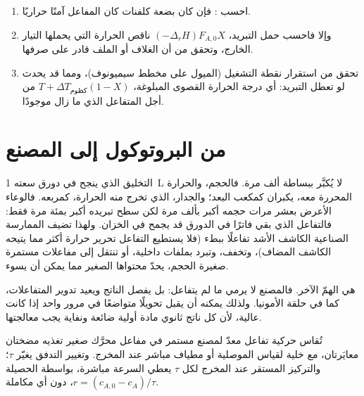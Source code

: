 \begin{method}\label{met:b2:continuous-reactors:heat-balance}
\begin{enumerate}
  \item احسب : فإن كان بضعة كلفنات كان
        المفاعل آمنًا حراريًا.
  \item وإلا فاحسب حمل التبريد، $(-\Delta_r H)F_{A,0}X$ ناقص
        الحرارة التي يحملها التيار الخارج، وتحقق من أن الغلاف أو الملف
        قادر على صرفها.
  \item تحقق من استقرار نقطة التشغيل (الميول على مخطط
        سيميونوف)، ومما قد يحدث لو تعطل التبريد: أي درجة الحرارة
        القصوى المبلوغة، $T + \Delta T_{\text{كظوم}}(1 - X)$ من أجل
        المتفاعل الذي ما زال موجودًا.
\end{enumerate}
\end{method}

\section{من البروتوكول إلى المصنع}

التخليق الذي ينجح في دورق سعته \qty{1}{L} لا يُكبَّر ببساطة ألف
مرة. فالحجم، والحرارة المحررة معه، يكبران كمكعب البعد؛ والجدار، الذي
تخرج منه الحرارة، كمربعه. فالوعاء الأعرض بعشر مرات حجمه أكبر بألف مرة
لكن سطح تبريده أكبر بمئة مرة فقط: فالتفاعل الذي بقي فاترًا في الدورق قد يجمح
في الخزان. ولهذا تضيف الممارسة الصناعية الكاشف الأشد تفاعلًا
ببطء (فلا يستطيع التفاعل تحرير حرارة أكثر مما يتيحه الكاشف المضاف)، وتخفف،
وتبرد بملفات داخلية، أو تنتقل إلى مفاعلات مستمرة صغيرة الحجم،
يحدّ محتواها الصغير مما يمكن أن يسوء.

 هي الهمّ الآخر. فالمصنع لا يرمي ما لم
يتفاعل: بل يفصل الناتج ويعيد تدوير المتفاعلات، كما في حلقة
الأمونيا. ولذلك يمكنه أن يقبل تحويلًا متواضعًا في مرور واحد إذا كانت
 عالية، لأن كل ناتج ثانوي مادة أولية ضائعة ونفاية يجب
معالجتها.

\begin{inthelab}
تُقاس حركية تفاعل معدّ لمصنع مستمر في مفاعل محرَّك صغير
تغذيه مضختان معايَرتان، مع خلية لقياس الموصلية
أو مطياف مباشر عند المخرج. وتغيير التدفق يغيّر $\tau$؛
والتركيز المستقر عند المخرج لكل $\tau$ يعطي السرعة مباشرة، بواسطة
الحصيلة $r = (c_{A,0} - c_A)/\tau$، دون أي مكاملة.
\end{inthelab}

